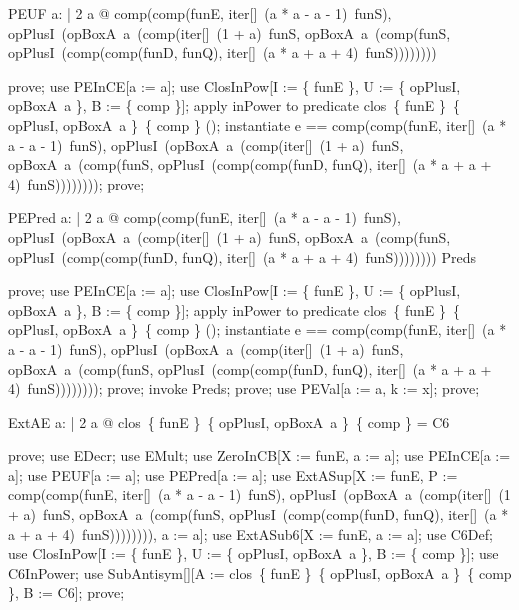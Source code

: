 \documentclass{article}
\begin{document}
\begin{theorem}{PEUF}
  \forall a: \nat | 2 \leq a @ comp(comp(funE, iter[\nat]~(a * a - a - 1)~funS), opPlusI~(opBoxA~a~(comp(iter[\nat]~(1 + a)~funS, opBoxA~a~(comp(funS, opPlusI~(comp(comp(funD, funQ), iter[\nat]~(a * a + a + 4)~funS)))))))) \in \nat \fun \nat
\end{theorem}

\begin{zproof}
prove;
use PEInCE[a := a];
use ClosInPow[I := \{ funE \}, U := \{ opPlusI, opBoxA~a \}, B := \{ comp \}];
apply inPower to predicate clos~\{ funE \}~\{ opPlusI, opBoxA~a \}~\{ comp \} \in \power (\nat \fun \nat);
instantiate e == comp(comp(funE, iter[\nat]~(a * a - a - 1)~funS), opPlusI~(opBoxA~a~(comp(iter[\nat]~(1 + a)~funS, opBoxA~a~(comp(funS, opPlusI~(comp(comp(funD, funQ), iter[\nat]~(a * a + a + 4)~funS))))))));
prove;
\end{zproof}

\begin{theorem}{PEPred}
  \forall a: \nat | 2 \leq a @ comp(comp(funE, iter[\nat]~(a * a - a - 1)~funS), opPlusI~(opBoxA~a~(comp(iter[\nat]~(1 + a)~funS, opBoxA~a~(comp(funS, opPlusI~(comp(comp(funD, funQ), iter[\nat]~(a * a + a + 4)~funS)))))))) \in Preds
\end{theorem}

\begin{zproof}
prove;
use PEInCE[a := a];
use ClosInPow[I := \{ funE \}, U := \{ opPlusI, opBoxA~a \}, B := \{ comp \}];
apply inPower to predicate clos~\{ funE \}~\{ opPlusI, opBoxA~a \}~\{ comp \} \in \power (\nat \fun \nat);
instantiate e == comp(comp(funE, iter[\nat]~(a * a - a - 1)~funS), opPlusI~(opBoxA~a~(comp(iter[\nat]~(1 + a)~funS, opBoxA~a~(comp(funS, opPlusI~(comp(comp(funD, funQ), iter[\nat]~(a * a + a + 4)~funS))))))));
prove;
invoke Preds;
prove;
use PEVal[a := a, k := x];
prove;
\end{zproof}

\begin{theorem}{ExtAE}
  \forall a: \nat | 2 \leq a @ clos~\{ funE \}~\{ opPlusI, opBoxA~a \}~\{ comp \} = C6
\end{theorem}

\begin{zproof}
prove;
use EDecr;
use EMult;
use ZeroInCB[X := funE, a := a];
use PEInCE[a := a];
use PEUF[a := a];
use PEPred[a := a];
use ExtASup[X := funE, P := comp(comp(funE, iter[\nat]~(a * a - a - 1)~funS), opPlusI~(opBoxA~a~(comp(iter[\nat]~(1 + a)~funS, opBoxA~a~(comp(funS, opPlusI~(comp(comp(funD, funQ), iter[\nat]~(a * a + a + 4)~funS)))))))), a := a];
use ExtASub6[X := funE, a := a];
use C6Def;
use ClosInPow[I := \{ funE \}, U := \{ opPlusI, opBoxA~a \}, B := \{ comp \}];
use C6InPower;
use SubAntisym[\nat \fun \nat][A := clos~\{ funE \}~\{ opPlusI, opBoxA~a \}~\{ comp \}, B := C6];
prove;
\end{zproof}
\end{document}
